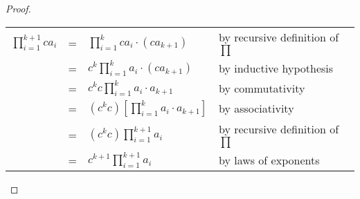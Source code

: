 \documentclass[14pt]{extarticle}
\newcommand{\dps}{\displaystyle}
\newcommand{\cy}{\color{cyan}}
\begin{document}
\begin{proof}
        \begin{center}
            \begin{tabular}{rcll}
                \(\dps \prod_{i=1}^{k+1} c a_i\) & = & \(\dps \prod_{i=1}^k c a_i \cdot (c a_{k+1})\)                & {\cy by recursive definition of $\prod$} \\
                                                 & = & \(\dps c^k \prod_{i=1}^k a_i \cdot (c a_{k+1})\)              & {\cy by inductive hypothesis}            \\
                                                 & = & \(\dps c^k c \prod_{i=1}^k a_i \cdot a_{k+1}\)                & {\cy by commutativity}                   \\
                                                 & = & \(\dps (c^k c) \left[\prod_{i=1}^k a_i \cdot a_{k+1}\right]\) & {\cy by associativity}                   \\
                                                 & = & \(\dps (c^k c) \prod_{i=1}^{k+1} a_i\)                        & {\cy by recursive definition of $\prod$} \\
                                                 & = & \(\dps c^{k+1} \prod_{i=1}^{k+1} a_i\)                        & {\cy by laws of exponents}
            \end{tabular}
        \end{center}
    \end{proof}
\end{document}
